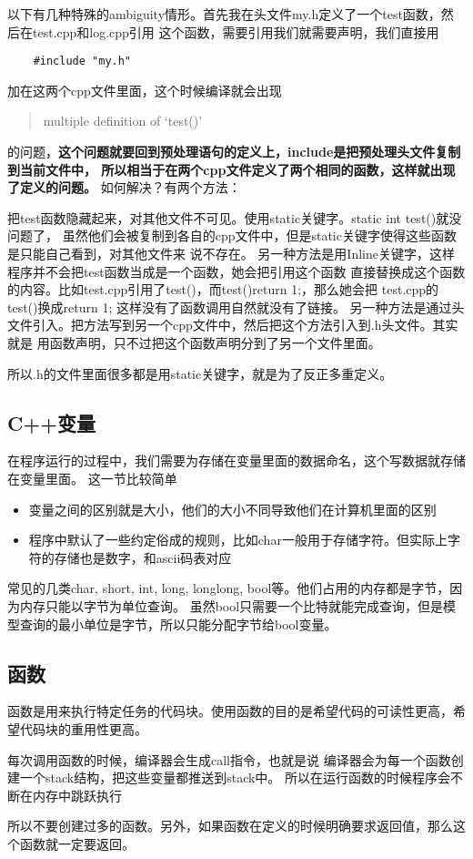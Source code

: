 \documentclass{article}
\begin{document}
\begin{sloppypar}
以下有几种特殊的ambiguity情形。首先我在头文件my.h定义了一个test函数，然后在test.cpp和log.cpp引用
这个函数，需要引用我们就需要声明，我们直接用
\begin{lstlisting}
	#include "my.h"
\end{lstlisting}
加在这两个cpp文件里面，这个时候编译就会出现
\begin{quotation}
	multiple definition of `test()'
\end{quotation}
的问题，\textbf{这个问题就要回到预处理语句的定义上，include是把预处理头文件复制到当前文件中，
所以相当于在两个cpp文件定义了两个相同的函数，这样就出现了定义的问题。}
如何解决？有两个方法：
\begin{outline}
	\1 把test函数隐藏起来，对其他文件不可见。使用static关键字。static int test()就没问题了，
	虽然他们会被复制到各自的cpp文件中，但是static关键字使得这些函数是只能自己看到，对其他文件来
	说不存在。
		\2 另一种方法是用Inline关键字，这样程序并不会把test函数当成是一个函数，她会把引用这个函数
		直接替换成这个函数的内容。比如test.cpp引用了test()，而test(){return 1;}，那么她会把
		test.cpp的test()换成return 1; 这样没有了函数调用自然就没有了链接。
	\1 另一种方法是通过头文件引入。把方法写到另一个cpp文件中，然后把这个方法引入到.h头文件。其实就是
	用函数声明，只不过把这个函数声明分到了另一个文件里面。
\end{outline}
所以.h的文件里面很多都是用static关键字，就是为了反正多重定义。

\subsection{C++变量}
在程序运行的过程中，我们需要为存储在变量里面的数据命名，这个写数据就存储在变量里面。
这一节比较简单
\begin{itemize}
	\item 变量之间的区别就是大小，他们的大小不同导致他们在计算机里面的区别
	\item 程序中默认了一些约定俗成的规则，比如char一般用于存储字符。但实际上字符的存储也是数字，和ascii码表对应
\end{itemize}
常见的几类char, short, int, long, longlong, bool等。他们占用的内存都是字节，因为内存只能以字节为单位查询。
虽然bool只需要一个比特就能完成查询，但是模型查询的最小单位是字节，所以只能分配字节给bool变量。

\subsection{函数}
函数是用来执行特定任务的代码块。使用函数的目的是希望代码的可读性更高，希望代码块的重用性更高。
\begin{outline}
	\1 每次调用函数的时候，编译器会生成call指令，也就是说
	编译器会为每一个函数创建一个stack结构，把这些变量都推送到stack中。
	\1 所以在运行函数的时候程序会不断在内存中跳跃执行
\end{outline}
所以不要创建过多的函数。另外，如果函数在定义的时候明确要求返回值，那么这个函数就一定要返回。


\end{sloppypar}
\end{document}
